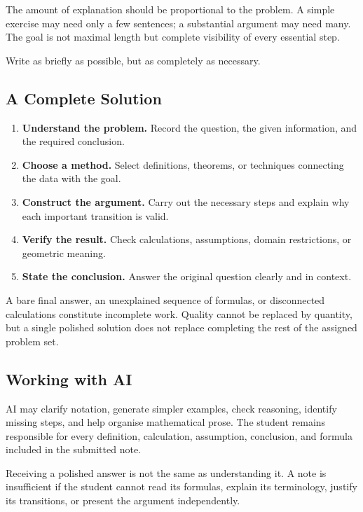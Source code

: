 The amount of explanation should be proportional to the problem. A simple
exercise may need only a few sentences; a substantial argument may need many.
The goal is not maximal length but complete visibility of every essential step.

Write as briefly as possible, but as completely as necessary.

\subsection*{A Complete Solution}

\begin{enumerate}
    \item \textbf{Understand the problem.}
    Record the question, the given information, and the required conclusion.

    \item \textbf{Choose a method.}
    Select definitions, theorems, or techniques connecting the data with the
    goal.

    \item \textbf{Construct the argument.}
    Carry out the necessary steps and explain why each important transition is
    valid.

    \item \textbf{Verify the result.}
    Check calculations, assumptions, domain restrictions, or geometric meaning.

    \item \textbf{State the conclusion.}
    Answer the original question clearly and in context.
\end{enumerate}

A bare final answer, an unexplained sequence of formulas, or disconnected
calculations constitute incomplete work. Quality cannot be replaced by quantity,
but a single polished solution does not replace completing the rest of the
assigned problem set.

\subsection*{Working with AI}

AI may clarify notation, generate simpler examples, check reasoning, identify
missing steps, and help organise mathematical prose. The student remains
responsible for every definition, calculation, assumption, conclusion, and
formula included in the submitted note.

Receiving a polished answer is not the same as understanding it. A note is
insufficient if the student cannot read its formulas, explain its terminology,
justify its transitions, or present the argument independently.

